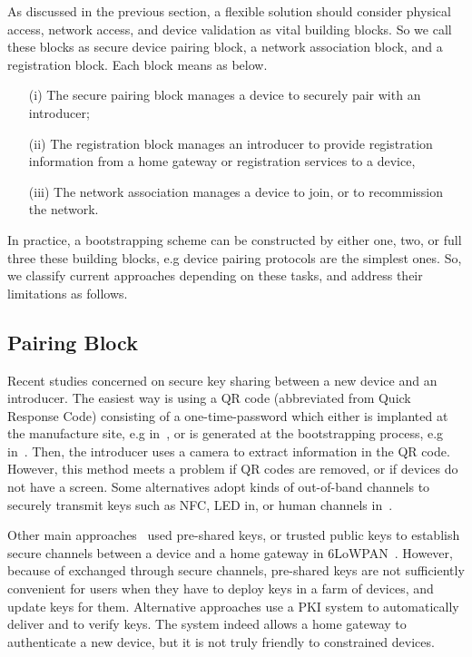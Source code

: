 As discussed in the previous section, a flexible solution should consider physical access, network access, and device validation as vital building blocks. So we call these blocks as secure device pairing block, a network association block, and a registration block. Each block means as below. 
\begin{enumerate}
\item [(i)] The secure pairing block manages a device to securely pair with an introducer; 
\item [(ii)] The registration block manages an introducer to provide registration information from a home gateway or registration services to a device,
\item [(iii)] The network association manages a device to join, or to recommission the network.
\end{enumerate}

In practice, a bootstrapping scheme can be constructed by either one, two, or full three these building blocks, e.g device pairing protocols are the simplest ones. So, we classify current approaches depending on these tasks, and address their limitations as follows. 

\subsection{Pairing Block}
Recent studies concerned on secure key sharing between a new device and an introducer. The easiest way is using a QR code (abbreviated from Quick Response Code) consisting of a one-time-password which either is implanted at the manufacture site, e.g in~\cite{Jeanning2013}, or is generated at the bootstrapping process, e.g in~\cite{Seung2015}. Then, the introducer uses a camera to extract information in the QR code. However, this method meets a problem if QR codes are removed, or if devices do not have a screen. Some alternatives adopt kinds of out-of-band channels to securely transmit keys such as NFC, LED in\cite{4159919}, or human channels in~\cite{5654588}.

Other main approaches~\cite{JCMjcm0708634642, Cha:2011:LSE:1968613.1968679, Ikram:2009:SLA:1582379.1582583, 6263790} used pre-shared keys, or trusted public keys to establish secure channels between a device and a home gateway in 6LoWPAN~\cite{6lowpan}. However, because of exchanged through secure channels, pre-shared keys are not sufficiently convenient for users when they have to deploy keys in a farm of devices, and update keys for them. Alternative approaches use a PKI system to automatically deliver and to verify keys. The system indeed allows a home gateway to authenticate a new device, but it is not truly friendly to constrained devices. 

